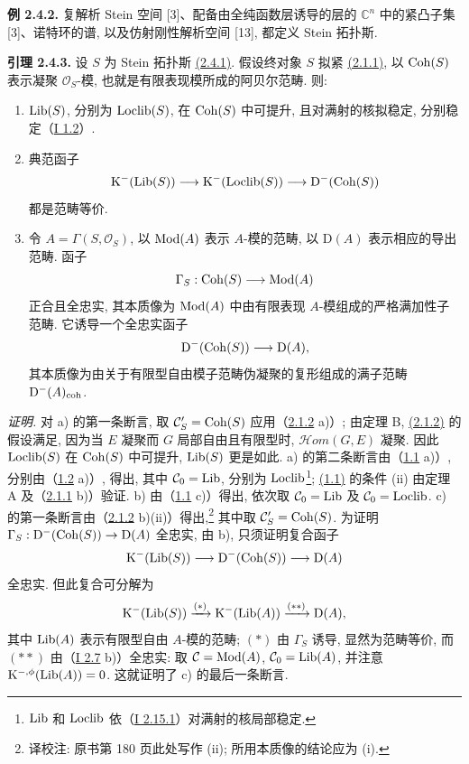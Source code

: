 \textbf{例 2.4.2.} 复解析 Stein 空间 [3]、配备由全纯函数层诱导的层的 $\mathbb C^n$ 中的紧凸子集 [3]、诺特环的谱, 以及仿射刚性解析空间 [13], 都定义 Stein 拓扑斯.

\textbf{引理 2.4.3.} 设 $S$ 为 Stein 拓扑斯 \hyperlink{sga6.e02.def.2-4-1}{(2.4.1)}. 假设终对象 $S$ 拟紧 \hyperlink{sga6.e02.lem.2-1-1}{(2.1.1)}, 以 $\operatorname{Coh}(S)$ 表示凝聚 $\mathcal O_S$-模, 也就是有限表现模所成的阿贝尔范畴. 则:
\begin{enumerate}[label=\alph*)]
\item $\operatorname{Lib}(S)$, 分别为 $\operatorname{Loclib}(S)$, 在 $\operatorname{Coh}(S)$ 中可提升, 且对满射的核拟稳定, 分别稳定（\hyperlink{sga6.e01.sec.1.2}{I 1.2}）.
\item 典范函子
\[
\mathrm K^{-}(\operatorname{Lib}(S))\longrightarrow \mathrm K^{-}(\operatorname{Loclib}(S))\longrightarrow \mathrm D^{-}(\operatorname{Coh}(S))
\]
都是范畴等价.
\item 令 $A=\Gamma(S,\mathcal O_S)$, 以 $\operatorname{Mod}(A)$ 表示 $A$-模的范畴, 以 $\mathrm D(A)$ 表示相应的导出范畴. 函子
\[
\Gamma_S:\operatorname{Coh}(S)\longrightarrow\operatorname{Mod}(A)
\]
正合且全忠实, 其本质像为 $\operatorname{Mod}(A)$ 中由有限表现 $A$-模组成的严格满加性子范畴. 它诱导一个全忠实函子
\[
\mathrm D^{-}(\operatorname{Coh}(S))\longrightarrow\mathrm D(A),
\]
其本质像为由关于有限型自由模子范畴伪凝聚的复形组成的满子范畴 $\mathrm D^{-}(A)_{\mathrm{coh}}$.
\end{enumerate}
\emph{证明.} 对 a) 的第一条断言, 取 $\mathcal C'_S=\operatorname{Coh}(S)$ 应用（\hyperlink{sga6.e02.lem.2-1-2}{2.1.2} a)）; 由定理 B, \hyperlink{sga6.e02.lem.2-1-2}{(2.1.2)} 的假设满足, 因为当 $E$ 凝聚而 $G$ 局部自由且有限型时, $\mathcal Hom(G,E)$ 凝聚. 因此 $\operatorname{Loclib}(S)$ 在 $\operatorname{Coh}(S)$ 中可提升, $\operatorname{Lib}(S)$ 更是如此. a) 的第二条断言由（\hyperlink{sga6.e02.prop.1-1}{1.1} a)）, 分别由（\hyperlink{sga6.e02.prop.1-2}{1.2} a)）, 得出, 其中 $\mathcal C_0=\operatorname{Lib}$, 分别为 $\operatorname{Loclib}$\footnote{$\operatorname{Lib}$ 和 $\operatorname{Loclib}$ 依（\hyperlink{sga6.e01.lem.2-15-1}{I 2.15.1}）对满射的核局部稳定.}; \hyperlink{sga6.e02.prop.1-1}{(1.1)} 的条件 (ii) 由定理 A 及（\hyperlink{sga6.e02.lem.2-1-1}{2.1.1} b)）验证. b) 由（\hyperlink{sga6.e02.prop.1-1}{1.1} c)）得出, 依次取 $\mathcal C_0=\operatorname{Lib}$ 及 $\mathcal C_0=\operatorname{Loclib}$. c) 的第一条断言由（\hyperlink{sga6.e02.lem.2-1-2}{2.1.2} b)(ii)）得出,\footnote{译校注: 原书第 180 页此处写作 (ii); 所用本质像的结论应为 (i).} 其中取 $\mathcal C'_S=\operatorname{Coh}(S)$. 为证明 $\Gamma_S:\mathrm D^{-}(\operatorname{Coh}(S))\to\mathrm D(A)$ 全忠实, 由 b), 只须证明复合函子
\[
\mathrm K^{-}(\operatorname{Lib}(S))\longrightarrow\mathrm D^{-}(\operatorname{Coh}(S))\longrightarrow\mathrm D(A)
\]
全忠实. 但此复合可分解为
\[
\mathrm K^{-}(\operatorname{Lib}(S))\xrightarrow{(*)}\mathrm K^{-}(\operatorname{Lib}(A))\xrightarrow{(**)}\mathrm D(A),
\]
其中 $\operatorname{Lib}(A)$ 表示有限型自由 $A$-模的范畴; $(*)$ 由 $\Gamma_S$ 诱导, 显然为范畴等价, 而 $(**)$ 由（\hyperlink{sga6.e01.prop.2-7}{I 2.7} b)）全忠实: 取 $\mathcal C=\operatorname{Mod}(A)$, $\mathcal C_0=\operatorname{Lib}(A)$, 并注意 $\mathrm K^{-,\phi}(\operatorname{Lib}(A))=0$. 这就证明了 c) 的最后一条断言.

